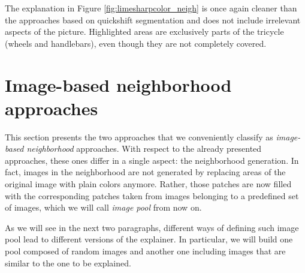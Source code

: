 \documentclass[12pt, twoside, a4paper]{report}
\begin{document}
The explanation in Figure \ref{fig:limesharpcolor_neigh} is once again cleaner than the approaches based on quickshift segmentation and does not include irrelevant aspects of the picture. Highlighted areas are exclusively parts of the tricycle (wheels and handlebars), even though they are not completely covered.


\section{Image-based neighborhood approaches}

This section presents the two approaches that we conveniently classify as \textit{image-based neighborhood} approaches. With respect to the already presented approaches, these ones differ in a single aspect: the neighborhood generation. In fact, images in the neighborhood are not generated by replacing areas of the original image with plain colors anymore. Rather, those patches are now filled with the corresponding patches taken from images belonging to a predefined set of images, which we will call \textit{image pool} from now on.

As we will see in the next two paragraphs, different ways of defining such image pool lead to different versions of the explainer. In particular, we will build one pool composed of random images and another one including images that are similar to the one to be explained.
\end{document}
